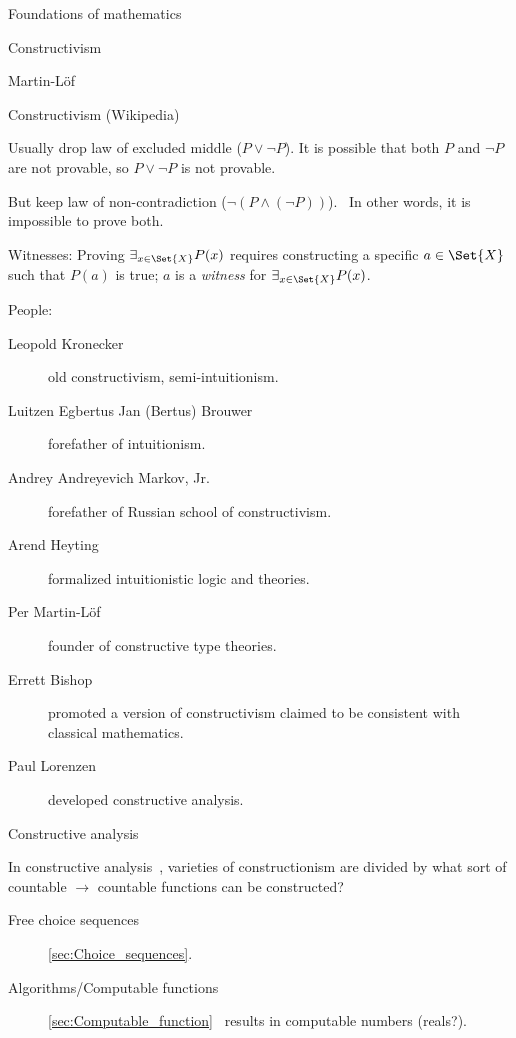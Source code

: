 \begin{plSection}{Foundations of mathematics}
\begin{plSection}{Constructivism}
\begin{plSection}{Martin-L\"{o}f}
\end{plSection}%
\begin{plSection}{Constructivism (Wikipedia)}
\label{sec:Constructivism_Wikipedia}

\cite{wiki:ConstructivismPhilosophyOfMathematics}

Usually drop law of excluded middle 
($P \vee \lnot P$).\cite{wiki:LawOfExcludedMiddle}
It is possible that both $P$ and $\lnot P$ are not provable,
so $P \vee \lnot P$ is not provable.

But keep law of non-contradiction
($\lnot ( P \wedge (\lnot P))$).~\cite{wiki:LawOfNoncontradiction}
In other words, it is impossible to prove both.

Witnesses: Proving $\exists _{x\in \Set{X}}P(x)$ requires
constructing a specific $a \in \Set{X}$ such that $P(a)$ is true; 
$a$ is a \textit{witness} for $\exists _{x\in \Set{X}}P(x)$.

People\cite{wiki:ConstructivismPhilosophyOfMathematics}:
\begin{description}
\item[Leopold Kronecker] old constructivism, semi-intuitionism.
\item[Luitzen Egbertus Jan (Bertus) Brouwer] forefather of intuitionism.
\item[Andrey Andreyevich Markov, Jr. ] forefather of Russian school of constructivism.
\item[Arend Heyting] formalized intuitionistic logic and theories.
\item[Per Martin-Löf] founder of constructive type theories.
\item[Errett Bishop] promoted a version of constructivism 
claimed to be consistent with classical mathematics.
\item[Paul Lorenzen] developed constructive analysis.
\end{description}

\end{plSection}%
\begin{plSection}{Constructive analysis}
\label{Constructive analysis}

In constructive 
analysis~\cite{wiki:ConstructiveAnalysis,
Bridger:2019,Henle:2012:RealNumbers},
varieties of constructionism are divided by
what sort of countable $\rightarrow$ countable functions can be 
constructed?~\cite{wiki:ConstructivismPhilosophyOfMathematics}
\begin{description}
\item[Free choice sequences] 
\cref{sec:Choice_sequences}\cite{wiki:ChoiceSequence}.
\item[Algorithms/Computable functions] 
\cref{sec:Computable_function}~\cite{wiki:ComputableFunction}
 results in computable numbers (reals?).
\end{description}


\end{plSection}
\end{plSection}
\end{plSection}
